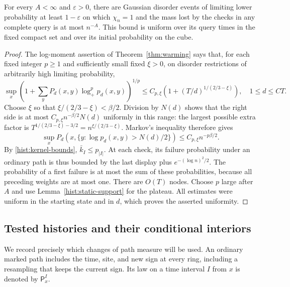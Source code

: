 \begin{lemma}\label{hist:gaussian-survival}
For every $A<\infty$ and $\varepsilon>0$, there are Gaussian disorder
events of limiting lower probability at least $1-\varepsilon$ on which
$\chi_n=1$ and the mass lost by the checks in any complete query is at most
$n^{-A}$.  This bound is uniform over its query times in the fixed compact
set and over its initial probability on the cube.
\end{lemma}

\begin{proof}
The log-moment assertion of Theorem~\ref{thm:warming} says that, for each fixed
integer $p\ge1$ and sufficiently small fixed $\xi>0$, on disorder restrictions
of arbitrarily high limiting probability,
\[
 \sup_x\left(1+\sum_yP_d(x,y)\log_+^p p_d(x,y)\right)^{1/p}
 \le C_{p,\xi}\left(1+(T/d)^{1/(2/3-\xi)}\right),\quad 1\le d\le CT.
\]
Choose $\xi$ so that $\xi/(2/3-\xi)<\beta/2$.  Division by $N(d)$ shows
that the right side is at most $C_{p,\xi}n^{-\beta/2}N(d)$ uniformly in
this range: the largest possible extra factor is
$T^{1/(2/3-\xi)-3/2}=n^{\xi/(2/3-\xi)}$.  Markov's inequality therefore
gives
\[
 \sup_xP_d(x,\{y:\log p_d(x,y)>N(d)/2\})
       \le C_{p,\xi}n^{-p\beta/2}.
\]
By \eqref{hist:kernel-bounds}, $\bar k_I\le p_{|I|}$.  At each check, its
failure probability under an ordinary path is thus bounded by the last
display plus $e^{-(\log n)^2/2}$.  The probability of a first failure is
at most the sum of these probabilities, because all preceding weights are
at most one.  There are $O(T)$ nodes.  Choose $p$ large after $A$ and use
Lemma~\ref{hist:static-support} for the plateau.  All estimates were uniform
in the starting state and in $d$, which proves the asserted uniformity.
\end{proof}

\subsection{Tested histories and their conditional interiors}

We record precisely which changes of path measure will be used.  An
ordinary marked path includes the time, site, and new sign at every ring,
including a resampling that keeps the current sign.  Its law on a time
interval $I$ from $x$ is denoted by $\mathsf P_x^I$.

